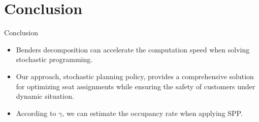
\section{Conclusion}
\frame{\sectionpage}

\begin{frame}{Conclusion}
    \begin{itemize}
        \item Benders decomposition can accelerate the computation speed when solving stochastic programming.
        
        \item Our approach, stochastic planning policy, provides a comprehensive solution for optimizing seat assignments while ensuring the safety of customers under dynamic situation.
        
        \item According to $\gamma$, we can estimate the occupancy rate when applying SPP.
    \end{itemize}
\end{frame}
